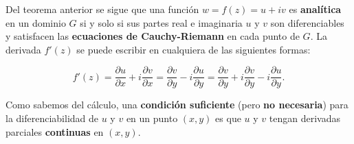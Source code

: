 \documentclass[10pt,a4paper]{book}
\begin{document}
Del teorema anterior se sigue que una funci\'on $ w = f(z) = u + iv $ es \textbf{anal\'itica} en un dominio $ G $ si y solo si sus partes real e imaginaria $ u $ y $ v $ son diferenciables y satisfacen las \textbf{ecuaciones de Cauchy-Riemann} en cada punto de $ G $. La derivada $ f'(z) $ se puede escribir en cualquiera de las siguientes formas:

\begin{equation}
    f'(z) = \frac{\partial u}{\partial x} + i \frac{\partial v}{\partial x} = \frac{\partial v}{\partial y} - i \frac{\partial u}{\partial y} = \frac{\partial v}{\partial y} + i \frac{\partial v}{\partial y} - i \frac{\partial u}{\partial y}.
\end{equation}

Como sabemos del c\'alculo, una \textbf{condici\'on suficiente} (pero \textbf{no necesaria}) para la diferenciabilidad de $ u $ y $ v $ en un punto $ (x,y) $ es que $ u $ y $ v $ tengan derivadas parciales \textbf{continuas} en $ (x,y) $. 
\end{document}
